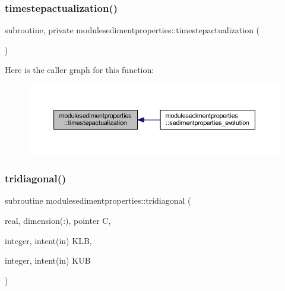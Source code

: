 \subsubsection{\texorpdfstring{timestepactualization()}{timestepactualization()}}
{\footnotesize\ttfamily subroutine, private modulesedimentproperties\+::timestepactualization (\begin{DoxyParamCaption}{ }\end{DoxyParamCaption})\hspace{0.3cm}{\ttfamily [private]}}

Here is the caller graph for this function\+:\nopagebreak
\begin{figure}[H]
\begin{center}
\leavevmode
\includegraphics[width=350pt]{namespacemodulesedimentproperties_a9bc2949e84269f97fba7dd6633e221d9_icgraph}
\end{center}
\end{figure}
\mbox{\label{namespacemodulesedimentproperties_a36e12eab9520e6564647d977991906bf}} 
\subsubsection{\texorpdfstring{tridiagonal()}{tridiagonal()}}
{\footnotesize\ttfamily subroutine modulesedimentproperties\+::tridiagonal (\begin{DoxyParamCaption}\item[{real, dimension(\+:), pointer}]{C,  }\item[{integer, intent(in)}]{K\+LB,  }\item[{integer, intent(in)}]{K\+UB }\end{DoxyParamCaption})\hspace{0.3cm}{\ttfamily [private]}}

